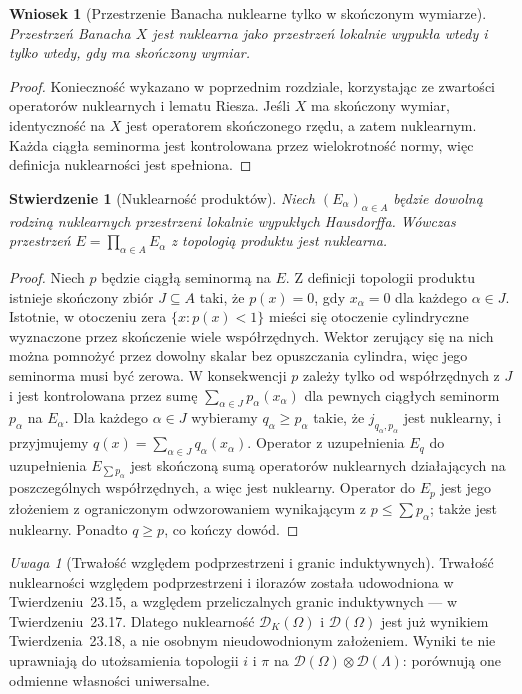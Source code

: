\documentclass[11pt,a4paper]{article}
\numberwithin{equation}{section}
\theoremstyle{plain}
\newtheorem{stwierdzenie}[twierdzenie]{Stwierdzenie}
\newtheorem{wniosek}[twierdzenie]{Wniosek}
\theoremstyle{definition}
\theoremstyle{remark}
\newtheorem{uwaga}[twierdzenie]{Uwaga}
\begin{document}
\begin{wniosek}[Przestrzenie Banacha nuklearne tylko w skończonym wymiarze]
\label{cor:banach-finite-nuclear24}
Przestrzeń Banacha $X$ jest nuklearna jako przestrzeń
lokalnie wypukła wtedy i tylko wtedy, gdy ma skończony wymiar.
\end{wniosek}
\begin{proof}
Konieczność wykazano w poprzednim rozdziale, korzystając ze
zwartości operatorów nuklearnych i lematu Riesza.
Jeśli $X$ ma skończony wymiar, identyczność na $X$ jest
operatorem skończonego rzędu, a zatem nuklearnym.
Każda ciągła seminorma jest kontrolowana przez wielokrotność
normy, więc definicja nuklearności jest spełniona.
\end{proof}


\begin{stwierdzenie}[Nuklearność produktów]
\label{prop:nuclear-products24}
Niech $(E_\alpha)_{\alpha\in A}$ będzie dowolną rodziną
nuklearnych przestrzeni lokalnie wypukłych Hausdorffa.
Wówczas przestrzeń $E=\prod_{\alpha\in A}E_\alpha$
z topologią produktu jest nuklearna.
\end{stwierdzenie}
\begin{proof}
Niech $p$ będzie ciągłą seminormą na $E$.
Z definicji topologii produktu istnieje skończony zbiór
$J\subseteq A$ taki, że $p(x)=0$, gdy $x_\alpha=0$
dla każdego $\alpha\in J$. Istotnie, w otoczeniu zera
$\{x:p(x)<1\}$ mieści się otoczenie cylindryczne
wyznaczone przez skończenie wiele współrzędnych.
Wektor zerujący się na nich można pomnożyć przez dowolny
skalar bez opuszczania cylindra, więc jego seminorma
musi być zerowa. W konsekwencji $p$ zależy tylko od
współrzędnych z $J$ i jest kontrolowana przez sumę
$\sum_{\alpha\in J}p_\alpha(x_\alpha)$ dla pewnych
ciągłych seminorm $p_\alpha$ na $E_\alpha$.
Dla każdego $\alpha\in J$ wybieramy $q_\alpha\ge p_\alpha$
takie, że $j_{q_\alpha,p_\alpha}$ jest nuklearny,
i przyjmujemy $q(x)=\sum_{\alpha\in J}q_\alpha(x_\alpha)$.
Operator z uzupełnienia $E_q$ do uzupełnienia
$E_{\sum p_\alpha}$ jest skończoną sumą operatorów
nuklearnych działających na poszczególnych współrzędnych,
a więc jest nuklearny. Operator do $E_p$ jest jego
złożeniem z ograniczonym odwzorowaniem wynikającym z
$p\le\sum p_\alpha$; także jest nuklearny.
Ponadto $q\ge p$, co kończy dowód.
\end{proof}

\begin{uwaga}[Trwałość względem podprzestrzeni i granic induktywnych]
\label{rem:nuclear-permanence24}
Trwałość nuklearności względem podprzestrzeni i ilorazów
została udowodniona w
Twierdzeniu~\textup{23.15}, a względem
przeliczalnych granic induktywnych --- w
Twierdzeniu~\textup{23.17}.
Dlatego nuklearność $\mathcal D_K(\Omega)$ i
$\mathcal D(\Omega)$ jest już wynikiem
Twierdzenia~\textup{23.18}, a nie osobnym
nieudowodnionym założeniem. Wyniki te nie uprawniają
do utożsamienia topologii $i$ i $\pi$ na
$\mathcal D(\Omega)\otimes\mathcal D(\Lambda)$:
porównują one odmienne własności uniwersalne.
\end{uwaga}
\end{document}
